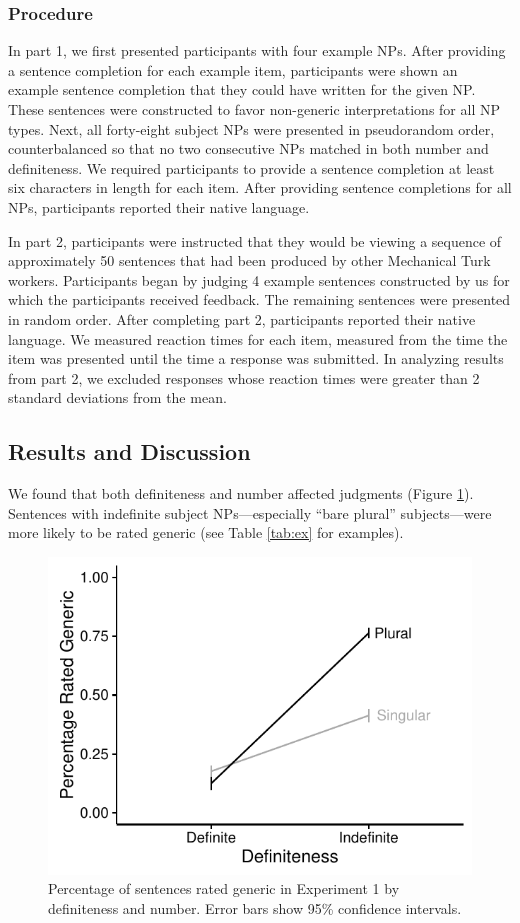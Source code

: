 \documentclass[10pt,letterpaper]{article}
\begin{document}
\subsubsection{Procedure}

In part 1, we first presented participants with four example NPs. After providing a sentence completion for each example item, participants were shown an example sentence completion that they could have written for the given NP. These sentences were constructed to favor non-generic interpretations for all NP types. Next, all forty-eight subject NPs were presented in pseudorandom order, counterbalanced so that no two consecutive NPs matched in both number and definiteness. We required participants to provide a sentence completion at least six characters in length for each item. After providing sentence completions for all NPs, participants reported their native language.

In part 2, participants were instructed that they would be viewing a sequence of approximately 50 sentences that had been produced by other Mechanical Turk workers. Participants began by judging 4 example sentences constructed by us for which the participants received feedback. The remaining sentences were presented in random order. After completing part 2, participants reported their native language. We measured reaction times for each item, measured from the time the item was presented until the time a response was submitted.  In analyzing results from part 2, we excluded responses whose reaction times were greater than 2 standard deviations from the mean.

\subsection{Results and Discussion}

We found that both definiteness and number affected judgments (Figure \ref{fig:e2}). Sentences with indefinite subject NPs---especially ``bare plural'' subjects---were more likely to be rated generic (see Table \ref{tab:ex} for examples).

\begin{figure}[t]
\centering
\includegraphics[width=.8\linewidth]{figures/e2-2016.pdf}
\caption{\label{fig:e2} Percentage of sentences rated generic in Experiment 1 by definiteness and number. Error bars show 95\% confidence intervals.}
\end{figure}
\end{document}
